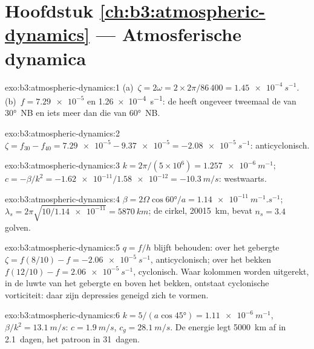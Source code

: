 \section*{Hoofdstuk \ref{ch:b3:atmospheric-dynamics} --- Atmosferische dynamica}

\begin{solution}{exo:b3:atmospheric-dynamics:1}
(a)~$\zeta = 2\omega = 2\times2\pi/86\,400 = \qty{1.45e-4}{s^{-1}}$.
(b)~$f = \num{7.29e-5}$ en \qty{1.26e-4}{s^{-1}}: de  heeft ongeveer
tweemaal de  van \ang{30}~NB en iets meer dan die van
\ang{60}~NB.
\end{solution}

\begin{solution}{exo:b3:atmospheric-dynamics:2}
$\zeta = f_{30} - f_{40} = \num{7.29e-5} - \num{9.37e-5} =
\qty{-2.08e-5}{s^{-1}}$: anticyclonisch.
\end{solution}

\begin{solution}{exo:b3:atmospheric-dynamics:3}
$k = 2\pi/(5\times10^6) = \qty{1.257e-6}{m^{-1}}$; $c = -\beta/k^2 =
-\num{1.62e-11}/\num{1.58e-12} = \qty{-10.3}{m/s}$: westwaarts.
\end{solution}

\begin{solution}{exo:b3:atmospheric-dynamics:4}
$\beta = 2\Omega\cos\ang{60}/a = \qty{1.14e-11}{m^{-1}.s^{-1}}$;
$\lambda_s = 2\pi\sqrt{10/\num{1.14e-11}} = \qty{5870}{km}$; de cirkel,
\qty{20015}{km}, bevat $n_s = 3.4$ golven.
\end{solution}

\begin{solution}{exo:b3:atmospheric-dynamics:5}
$q = f/h$ blijft behouden: over het gebergte $\zeta = f(8/10) - f =
\qty{-2.06e-5}{s^{-1}}$, anticyclonisch; over het bekken $f(12/10) - f =
\qty{+2.06e-5}{s^{-1}}$, cyclonisch. Waar kolommen worden uitgerekt, in de luwte
van het gebergte en boven het bekken, ontstaat cyclonische vorticiteit:
daar zijn depressies geneigd zich te vormen.
\end{solution}

\begin{solution}{exo:b3:atmospheric-dynamics:6}
$k = 5/(a\cos\ang{45}) = \qty{1.11e-6}{m^{-1}}$, $\beta/k^2 =
\qty{13.1}{m/s}$: $c = \qty{1.9}{m/s}$, $c_g = \qty{28.1}{m/s}$. De energie
legt \qty{5000}{km} af in \num{2.1}~dagen, het patroon in \num{31}~dagen.
\end{solution}

